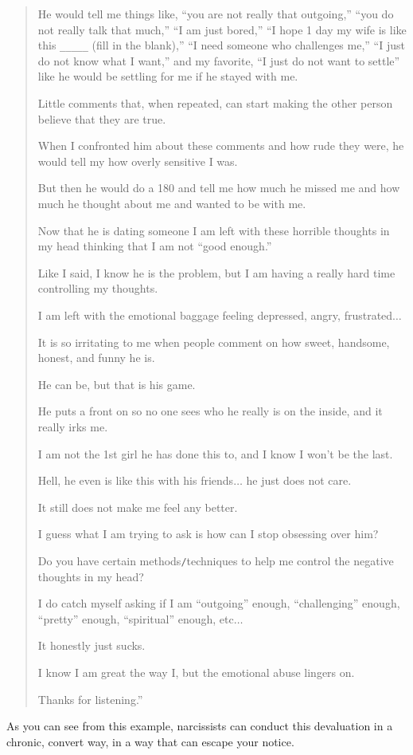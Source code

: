 \documentclass[oneside]{book}
\numberwithin{equation}{section}
\begin{document}
\begin{quotation}
    He would tell me things like, ``you are not really that outgoing,'' ``you do not really talk that much,'' ``I am just bored,'' ``I hope 1 day my wife is like this \verb|_____| (fill in the blank),'' ``I need someone who challenges me,'' ``I just do not know what I want,'' and my favorite, ``I just do not want to settle'' like he would be settling for me if he stayed with me.
    
    Little comments that, when repeated, can start making the other person believe that they are true.
    
    When I confronted him about these comments and how rude they were, he would tell my how overly sensitive I was.
    
    But then he would do a 180 and tell me how much he missed me and how much he thought about me and wanted to be with me.
    
    Now that he is dating someone I am left with these horrible thoughts in my head thinking that I am not ``good enough.''
    
    Like I said, I know he is the problem, but I am having a really hard time controlling my thoughts.
    
    I am left with the emotional baggage feeling depressed, angry, frustrated$\ldots$
    
    It is so irritating to me when people comment on how sweet, handsome, honest, and funny he is.
    
    He can be, but that is his game.
    
    He puts a front on so no one sees who he really is on the inside, and it really irks me.
    
    I am not the 1st girl he has done this to, and I know I won't be the last.
    
    Hell, he even is like this with his friends$\ldots$ he just does not care.
    
    It still does not make me feel any better.
    
    I guess what I am trying to ask is how can I stop obsessing over him?
    
    Do you have certain methods\texttt{/}techniques to help me control the negative thoughts in my head?
    
    I do catch myself asking if I am ``outgoing'' enough, ``challenging'' enough, ``pretty'' enough, ``spiritual'' enough, etc$\ldots$
    
    It honestly just sucks.
    
    I know I am great the way I, but the emotional abuse lingers on.
    
    Thanks for listening.''
\end{quotation}
As you can see from this example, narcissists can conduct this devaluation in a chronic, convert way, in a way that can escape your notice.
\end{document}
